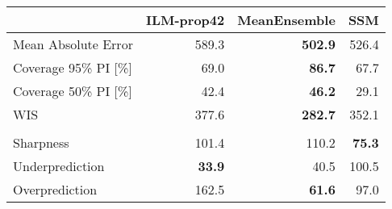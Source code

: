 
\begin{tabular}[t]{l>{}r>{}r>{}r}
\toprule
 & ILM-prop42 & MeanEnsemble & SSM\\
\midrule
Mean Absolute Error & 589.3 & \textbf{502.9} & 526.4\\
Coverage 95\% PI [\%] & 69.0 & \textbf{86.7} & 67.7\\
Coverage 50\% PI [\%] & 42.4 & \textbf{46.2} & 29.1\\
WIS & 377.6 & \textbf{282.7} & 352.1\\
\addlinespace[0.3em]
\multicolumn{4}{l}{\textbf{WIS components}}\\
\hspace{1em}Sharpness & 101.4 & 110.2 & \textbf{75.3}\\
\hspace{1em}Underprediction & \textbf{33.9} & 40.5 & 100.5\\
\hspace{1em}Overprediction & 162.5 & \textbf{61.6} & 97.0\\
\bottomrule
\end{tabular}
